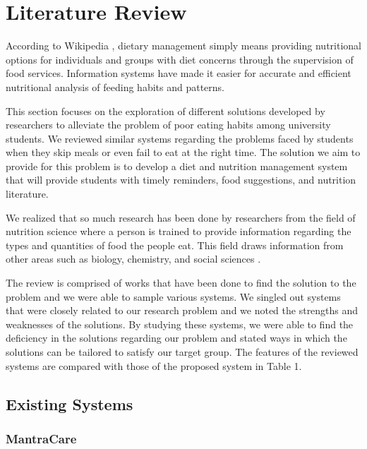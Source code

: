 \documentclass{article}
\begin{document}
\section{Literature Review}

According to Wikipedia \citeyear{wikipedia2019dietary}, dietary management simply means providing nutritional options for individuals and groups with diet concerns through the supervision of food services. Information systems have made it easier for accurate and efficient nutritional analysis of feeding habits and patterns.

This section focuses on the exploration of different solutions developed by researchers to alleviate the problem of poor eating habits among university students. We reviewed similar systems regarding the problems faced by students when they skip meals or even fail to eat at the right time. The solution we aim to provide for this problem is to develop a diet and nutrition management system that will provide students with timely reminders, food suggestions, and nutrition literature.

We realized that so much research has been done by researchers from the field of nutrition science where a person is trained to provide information regarding the types and quantities of food the people eat. This field draws information from other areas such as biology, chemistry, and social sciences \cite{sriram2020hire}.

The review is comprised of works that have been done to find the solution to the problem and we were able to sample various systems. We singled out systems that were closely related to our research problem and we noted the strengths and weaknesses of the solutions. By studying these systems, we were able to find the deficiency in the solutions regarding our problem and stated ways in which the solutions can be tailored to satisfy our target group. The features of the reviewed systems are compared with those of the proposed system in Table 1.

\subsection{Existing Systems}

\subsubsection{MantraCare}
\end{document}
